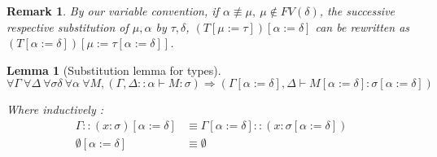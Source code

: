 \documentclass{article}
\newtheorem{lemma}[theorem]{Lemma}
\newtheorem*{remark}{Remark}
\begin{document}
    \begin{remark}\label{remark}
        By our variable convention, if $\alpha\not\equiv\mu, \ \mu\not\in FV(\delta)$, the successive respective substitution of $\mu,\alpha$ by $\tau,\delta$, $(T[\mu:=\tau])[\alpha:=\delta]$ can be rewritten as $(T[\alpha:=\delta])[\mu:=\tau[\alpha:=\delta]]$.
    \end{remark}
    
    \begin{lemma}[Substitution lemma for types]\label{substitution lemma types}
    $$\forall\Gamma\ \forall\Delta\ \forall\sigma\delta\ \forall\alpha\ \forall M, (\Gamma,\Delta::\alpha\vdash M : \sigma) \Rightarrow (\Gamma[\alpha:=\delta],\Delta\vdash M[\alpha:=\delta] : \sigma[\alpha:=\delta])$$
    
    Where inductively : \begin{align*}
        \Gamma::(x : \sigma)[\alpha:=\delta] &\equiv \Gamma[\alpha:=\delta]::(x : \sigma[\alpha:=\delta])\\
        \emptyset[\alpha:=\delta] &\equiv \emptyset 
    \end{align*}
    \end{lemma}
    
\end{document}
